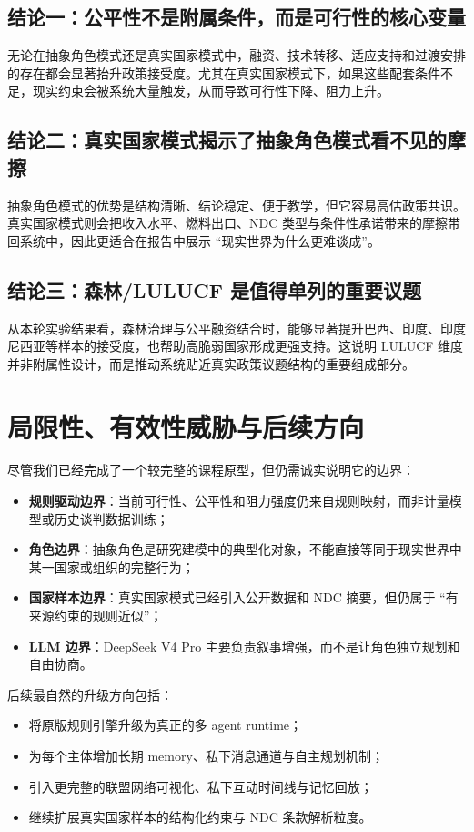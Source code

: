 \documentclass[12pt,a4paper]{ctexart}
\begin{document}
\subsection{结论一：公平性不是附属条件，而是可行性的核心变量}
无论在抽象角色模式还是真实国家模式中，融资、技术转移、适应支持和过渡安排的存在都会显著抬升政策接受度。尤其在真实国家模式下，如果这些配套条件不足，现实约束会被系统大量触发，从而导致可行性下降、阻力上升。

\subsection{结论二：真实国家模式揭示了抽象角色模式看不见的摩擦}
抽象角色模式的优势是结构清晰、结论稳定、便于教学，但它容易高估政策共识。真实国家模式则会把收入水平、燃料出口、NDC 类型与条件性承诺带来的摩擦带回系统中，因此更适合在报告中展示 ``现实世界为什么更难谈成''。

\subsection{结论三：森林/LULUCF 是值得单列的重要议题}
从本轮实验结果看，森林治理与公平融资结合时，能够显著提升巴西、印度、印度尼西亚等样本的接受度，也帮助高脆弱国家形成更强支持。这说明 LULUCF 维度并非附属性设计，而是推动系统贴近真实政策议题结构的重要组成部分。

\section{局限性、有效性威胁与后续方向}
尽管我们已经完成了一个较完整的课程原型，但仍需诚实说明它的边界：
\begin{itemize}
  \item \textbf{规则驱动边界}：当前可行性、公平性和阻力强度仍来自规则映射，而非计量模型或历史谈判数据训练；
  \item \textbf{角色边界}：抽象角色是研究建模中的典型化对象，不能直接等同于现实世界中某一国家或组织的完整行为；
  \item \textbf{国家样本边界}：真实国家模式已经引入公开数据和 NDC 摘要，但仍属于 ``有来源约束的规则近似''；
  \item \textbf{LLM 边界}：DeepSeek V4 Pro 主要负责叙事增强，而不是让角色独立规划和自由协商。
\end{itemize}

后续最自然的升级方向包括：
\begin{itemize}
  \item 将原版规则引擎升级为真正的多 agent runtime；
  \item 为每个主体增加长期 memory、私下消息通道与自主规划机制；
  \item 引入更完整的联盟网络可视化、私下互动时间线与记忆回放；
  \item 继续扩展真实国家样本的结构化约束与 NDC 条款解析粒度。
\end{itemize}
\end{document}
